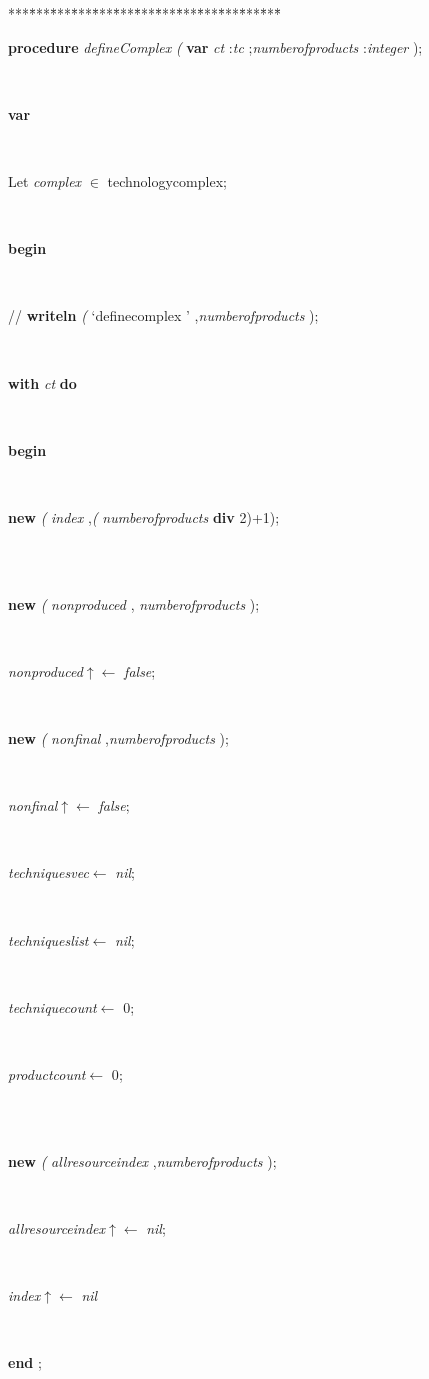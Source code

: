 \begin{tabbing}
***\=***\=***\=***\=***\=***\=***\=***\=***\=***\=***\=***\=***\=\kill
\parbox{14cm}{\textsf{\textbf{procedure}   \textit{defineComplex} \textit{(} \textbf{var}  \textit{ct} :\textit{tc} ;\textit{numberofproducts} :\textit{integer} );}}\\
\+\parbox{14cm}{\textsf{\textbf{var} }}\\
\parbox{14cm}{\textsf{Let \textit{complex} $\in$ technologycomplex;}}\\
\-\<\+\parbox{14cm}{\textsf{\textbf{begin} }}\\
\parbox{14cm}{\textsf{//  \textbf{writeln} \textit{(} \textrm{\textup { `definecomplex ' } },\textit{numberofproducts} );}}\\
\+\parbox{14cm}{\textsf {\textbf {with } \textsf{ \textit{ct}  } \textbf{ do } }}\\
\<\parbox{14cm}{\textsf{\textbf{begin} }}\\
\parbox{14cm}{\textsf{\textbf{new} \textit{(} \textit{index} ,\textit{(} \textit{numberofproducts}  \textbf{div}  2)+1);}}\\
\\
\parbox{14cm}{\textsf{\textbf{new}  \textit{(} \textit{nonproduced} , \textit{numberofproducts} );}}\\
\parbox{14cm}{\textsf{\textit{nonproduced}$\uparrow$\textit{}$\leftarrow$ \textit{false}}; }\\
\parbox{14cm}{\textsf{\textbf{new}  \textit{(} \textit{nonfinal} ,\textit{numberofproducts} );}}\\
\parbox{14cm}{\textsf{\textit{nonfinal}$\uparrow$\textit{}$\leftarrow$ \textit{false}}; }\\
\parbox{14cm}{\textsf{\textit{techniquesvec}$\leftarrow$ \textit{nil}}; }\\
\parbox{14cm}{\textsf{\textit{techniqueslist}$\leftarrow$ \textit{nil}}; }\\
\parbox{14cm}{\textsf{\textit{techniquecount}$\leftarrow$ 0}; }\\
\parbox{14cm}{\textsf{\textit{productcount}$\leftarrow$ 0}; }\\
\\
\parbox{14cm}{\textsf{\textbf{new} \textit{(} \textit{allresourceindex} ,\textit{numberofproducts} );}}\\
\parbox{14cm}{\textsf{\textit{allresourceindex}$\uparrow$\textit{}$\leftarrow$ \textit{nil}}; }\\
\parbox{14cm}{\textsf{\textit{index}$\uparrow$\textit{}$\leftarrow$ \textit{nil}}}\\
\<\-\parbox{14cm}{\textsf{\textbf{end} ;}}\\
\end{tabbing}
